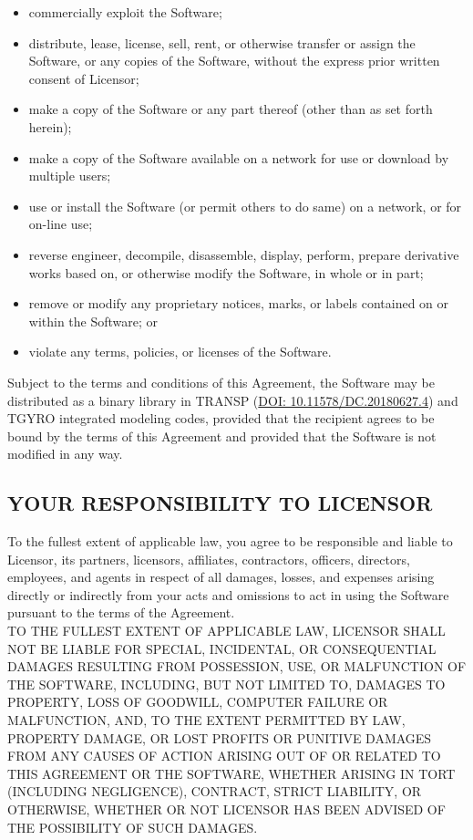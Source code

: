 \documentclass[11pt]{article}
\begin{document}
\begin{itemize}
\item commercially exploit the Software;
\item distribute, lease, license, sell, rent, or otherwise transfer or assign the Software, or any copies of the Software, without the express prior written consent of Licensor;
\item make a copy of the Software or any part thereof (other than as set forth herein);
\item make a copy of the Software available on a network for use or download by multiple users;
\item use or install the Software (or permit others to do same) on a network, or for on-line use;
\item reverse engineer, decompile, disassemble, display, perform, prepare derivative works based on, or otherwise modify the Software, in whole or in part;
\item remove or modify any proprietary notices, marks, or labels contained on or within the Software; or
\item violate any terms, policies, or licenses of the Software.
\end{itemize}
Subject to the terms and conditions of this Agreement, the Software may be distributed as a binary library in TRANSP (\href{https://doi.org/10.11578/dc.20180627.4}{DOI: 10.11578/DC.20180627.4}) and TGYRO integrated modeling codes, provided that the recipient agrees to be bound by the terms of this Agreement and provided that the Software is not modified in any way.

\subsection*{YOUR RESPONSIBILITY TO LICENSOR}
To the fullest extent of applicable law, you agree to be responsible and liable to Licensor, its partners, licensors, affiliates, contractors, officers, directors, employees, and agents in respect of all damages, losses, and expenses arising directly or indirectly from your acts and omissions to act in using the Software pursuant to the terms of the Agreement.\\[\baselineskip]
TO THE FULLEST EXTENT OF APPLICABLE LAW, LICENSOR SHALL NOT BE LIABLE FOR SPECIAL, INCIDENTAL, OR CONSEQUENTIAL DAMAGES RESULTING FROM POSSESSION, USE, OR MALFUNCTION OF THE SOFTWARE, INCLUDING, BUT NOT LIMITED TO, DAMAGES TO PROPERTY, LOSS OF GOODWILL, COMPUTER FAILURE OR MALFUNCTION, AND, TO THE EXTENT PERMITTED BY LAW, PROPERTY DAMAGE, OR LOST PROFITS OR PUNITIVE DAMAGES FROM ANY CAUSES OF ACTION ARISING OUT OF OR RELATED TO THIS AGREEMENT OR THE SOFTWARE, WHETHER ARISING IN TORT (INCLUDING NEGLIGENCE), CONTRACT, STRICT LIABILITY, OR OTHERWISE, WHETHER OR NOT LICENSOR HAS BEEN ADVISED OF THE POSSIBILITY OF SUCH DAMAGES.
\end{document}
